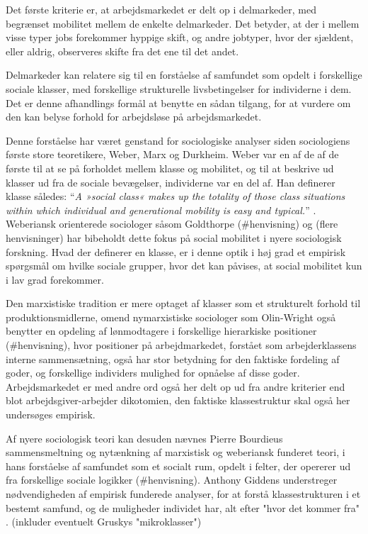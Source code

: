 Det første kriterie er, at arbejdsmarkedet er delt op i delmarkeder, med begrænset mobilitet mellem de enkelte delmarkeder. Det betyder, at der i mellem visse typer jobs forekommer hyppige skift, og andre jobtyper, hvor der sjældent, eller aldrig, observeres skifte fra det ene til det andet.

Delmarkeder kan relatere sig til en forståelse af samfundet som opdelt i forskellige sociale klasser, med forskellige strukturelle livsbetingelser for individerne i dem. Det er denne afhandlings formål at benytte en sådan tilgang, for at vurdere om den kan belyse forhold for arbejdsløse på arbejdsmarkedet.

Denne forståelse har været genstand for sociologiske analyser siden sociologiens første store teoretikere, Weber, Marx og Durkheim. Weber var en af de af de første til at se på forholdet mellem klasse og mobilitet, og til at beskrive ud klasser ud fra de sociale bevægelser, individerne var en del af. Han definerer klasse således: “\emph{A »social class« makes up the totality of those class situations within which individual and generational mobility is easy and typical.}” \parencite[302]{Weber1978}. Weberiansk orienterede sociologer såsom Goldthorpe (\#henvisning) og (flere henvisninger) har bibeholdt dette fokus på social mobilitet i nyere sociologisk forskning. Hvad der definerer en klasse, er i denne optik i høj grad et empirisk spørgsmål om hvilke sociale grupper, hvor det kan påvises, at social mobilitet kun i lav grad forekommer.

Den marxistiske tradition er mere optaget af klasser som et strukturelt forhold til produktionsmidlerne, omend nymarxistiske sociologer som Olin-Wright også benytter en opdeling af lønmodtagere i forskellige hierarkiske positioner (\#henvisning), hvor positioner på arbejdmarkedet, forstået som arbejderklassens interne sammensætning, også har stor betydning for den faktiske fordeling af goder, og forskellige individers mulighed for opnåelse af disse goder. Arbejdsmarkedet er med andre ord også her delt op ud fra andre kriterier end blot arbejdsgiver-arbejder dikotomien, den faktiske klassestruktur skal også her undersøges empirisk.

Af nyere sociologisk teori kan desuden nævnes Pierre Bourdieus sammensmeltning og nytænkning af marxistisk og weberiansk funderet teori, i hans forståelse af samfundet som et socialt rum, opdelt i felter, der opererer ud fra forskellige sociale logikker (\#henvisning). Anthony Giddens understreger nødvendigheden af empirisk funderede analyser, for at forstå klassestrukturen i et bestemt samfund, og de muligheder individet har, alt efter "hvor det kommer fra" \parencite[48,110]{Giddens1973}. (inkluder eventuelt Gruskys "mikroklasser")

